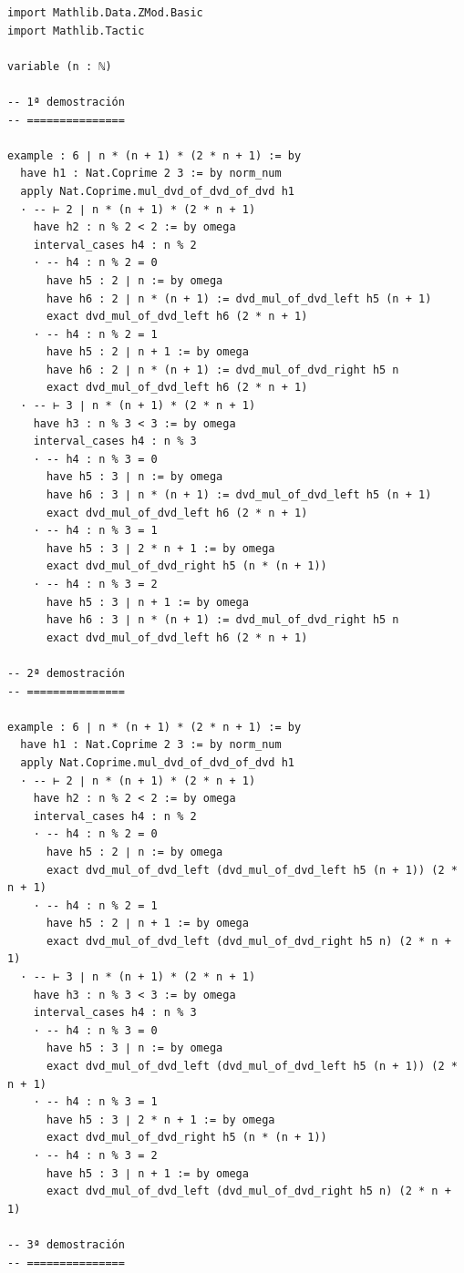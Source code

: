 \begin{verbatim}
import Mathlib.Data.ZMod.Basic
import Mathlib.Tactic

variable (n : ℕ)

-- 1ª demostración
-- ===============

example : 6 ∣ n * (n + 1) * (2 * n + 1) := by
  have h1 : Nat.Coprime 2 3 := by norm_num
  apply Nat.Coprime.mul_dvd_of_dvd_of_dvd h1
  · -- ⊢ 2 ∣ n * (n + 1) * (2 * n + 1)
    have h2 : n % 2 < 2 := by omega
    interval_cases h4 : n % 2
    · -- h4 : n % 2 = 0
      have h5 : 2 ∣ n := by omega
      have h6 : 2 ∣ n * (n + 1) := dvd_mul_of_dvd_left h5 (n + 1)
      exact dvd_mul_of_dvd_left h6 (2 * n + 1)
    · -- h4 : n % 2 = 1
      have h5 : 2 ∣ n + 1 := by omega
      have h6 : 2 ∣ n * (n + 1) := dvd_mul_of_dvd_right h5 n
      exact dvd_mul_of_dvd_left h6 (2 * n + 1)
  · -- ⊢ 3 ∣ n * (n + 1) * (2 * n + 1)
    have h3 : n % 3 < 3 := by omega
    interval_cases h4 : n % 3
    · -- h4 : n % 3 = 0
      have h5 : 3 ∣ n := by omega
      have h6 : 3 ∣ n * (n + 1) := dvd_mul_of_dvd_left h5 (n + 1)
      exact dvd_mul_of_dvd_left h6 (2 * n + 1)
    · -- h4 : n % 3 = 1
      have h5 : 3 ∣ 2 * n + 1 := by omega
      exact dvd_mul_of_dvd_right h5 (n * (n + 1))
    · -- h4 : n % 3 = 2
      have h5 : 3 ∣ n + 1 := by omega
      have h6 : 3 ∣ n * (n + 1) := dvd_mul_of_dvd_right h5 n
      exact dvd_mul_of_dvd_left h6 (2 * n + 1)

-- 2ª demostración
-- ===============

example : 6 ∣ n * (n + 1) * (2 * n + 1) := by
  have h1 : Nat.Coprime 2 3 := by norm_num
  apply Nat.Coprime.mul_dvd_of_dvd_of_dvd h1
  · -- ⊢ 2 ∣ n * (n + 1) * (2 * n + 1)
    have h2 : n % 2 < 2 := by omega
    interval_cases h4 : n % 2
    · -- h4 : n % 2 = 0
      have h5 : 2 ∣ n := by omega
      exact dvd_mul_of_dvd_left (dvd_mul_of_dvd_left h5 (n + 1)) (2 * n + 1)
    · -- h4 : n % 2 = 1
      have h5 : 2 ∣ n + 1 := by omega
      exact dvd_mul_of_dvd_left (dvd_mul_of_dvd_right h5 n) (2 * n + 1)
  · -- ⊢ 3 ∣ n * (n + 1) * (2 * n + 1)
    have h3 : n % 3 < 3 := by omega
    interval_cases h4 : n % 3
    · -- h4 : n % 3 = 0
      have h5 : 3 ∣ n := by omega
      exact dvd_mul_of_dvd_left (dvd_mul_of_dvd_left h5 (n + 1)) (2 * n + 1)
    · -- h4 : n % 3 = 1
      have h5 : 3 ∣ 2 * n + 1 := by omega
      exact dvd_mul_of_dvd_right h5 (n * (n + 1))
    · -- h4 : n % 3 = 2
      have h5 : 3 ∣ n + 1 := by omega
      exact dvd_mul_of_dvd_left (dvd_mul_of_dvd_right h5 n) (2 * n + 1)

-- 3ª demostración
-- ===============


\end{verbatim}
